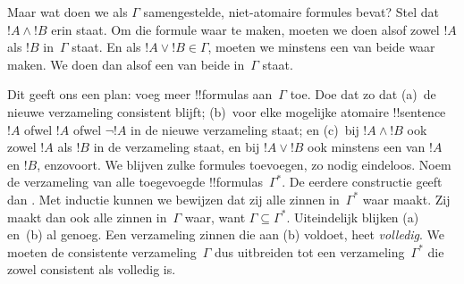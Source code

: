 \documentclass[../../../include/open-logic-section]{subfiles}
\begin{document}
Maar wat doen we als $\Gamma$ samengestelde, niet-atomaire formules
bevat? Stel dat $!A \land !B$ erin staat. Om die formule waar te maken,
moeten we doen alsof zowel $!A$ als $!B$ in~$\Gamma$ staat. En als
$!A \lor !B \in \Gamma$, moeten we minstens een van beide waar maken.
We doen dan alsof een van beide in~$\Gamma$ staat.

Dit geeft ons een plan: voeg meer !!{formula}s aan~$\Gamma$ toe. Doe
dat zo dat (a)~de nieuwe verzameling consistent blijft; (b)~voor elke
mogelijke atomaire !!{sentence}~$!A$ ofwel $!A$ ofwel $\lnot !A$ in de
nieuwe verzameling staat; en (c)~bij $!A \land !B$ ook zowel $!A$ als
$!B$ in de verzameling staat, en bij $!A \lor !B$ ook minstens een van
$!A$ en $!B$, enzovoort. We blijven zulke formules toevoegen, zo nodig
eindeloos. Noem de verzameling van alle toegevoegde
!!{formula}s~$\Gamma^*$. De eerdere constructie geeft dan
.
Met inductie kunnen we bewijzen dat zij alle zinnen in~$\Gamma^*$ waar
maakt. Zij maakt dan ook alle zinnen in~$\Gamma$ waar, want
$\Gamma \subseteq \Gamma^*$. Uiteindelijk blijken (a) en~(b) al
genoeg. Een verzameling zinnen die aan (b) voldoet, heet
\emph{volledig}. We moeten de consistente verzameling~$\Gamma$ dus
uitbreiden tot een verzameling~$\Gamma^*$ die zowel consistent als
volledig is.
\end{document}
